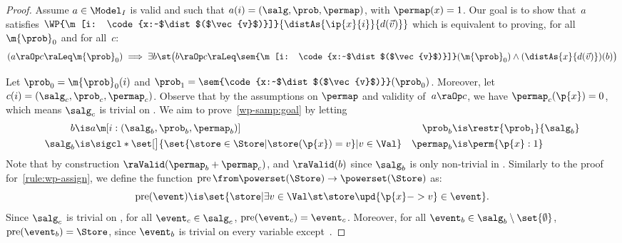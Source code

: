 \begin{proof}
  \newcommand{\specialevent}{A}
  Assume $a \in \Model_I$ is valid and such that
  $ a(i) = (\salg, \prob, \permap)$, with $\permap(x) = 1$.
  Our goal is to show that~$a$ satisfies
  $
    \WP {\m[i: \code{x:~$\dist$($\vec{v}$)}]} {\distAs{\ip{x}{i}}{d(\vec{v})}}
  $
which is equivalent to proving, for all $\m{\prob}_0$ and for all~$c$:
\begin{equation}
    (a\raOp c \raLeq  \m{\prob}_0)
    \implies
      \exists b\st \bigl(
        b\raOp c \raLeq \sem{\m[i: \code{x:~$\dist$($\vec{v}$)}]}(\m{\prob}_0)
        \land
        (\distAs{x}{d(\vec{v})})(b)
      \bigr)
    \label{wp-samp:goal}
  \end{equation}

  Let $\prob_0 = \m{\prob}_0(i)$ and
      $\prob_1 = \sem{\code{x:~$\dist$($\vec{v}$)}}(\prob_0)$.
  Moreover, let $ c(i) = (\salg_c,\prob_c,\permap_c) $.
  Observe that by the assumptions on $\permap$ and validity of~$a \raOp c$,
  we have $\permap_c(\p{x})=0$,
  which means $\salg_c$ is trivial on .
  We aim to prove~\eqref{wp-samp:goal} by letting
  \begin{align*}
    b &\is a\m[i: {(\salg_b, \prob_b, \permap_b)}]
    &
    \prob_b &\is
      \restr{\prob_1}{\salg_b}
    \\
    \salg_b &\is
      \sigcl*{
        \set[\big]{
          \set{ \store \in \Store | \store(\p{x}) = v }
        | v\in \Val
        }
      }
    &
    \permap_b &\is
      \perm{\p{x}: 1}
\end{align*}
  Note that by construction $ \raValid(\permap_b + \permap_c) $,
  and $\raValid(b)$ since $\salg_b$ is only non-trivial in .
  \newcommand{\Pre}{\operatorname{pre}}
  Similarly to the proof for~\cref{rule:wp-assign},
  we define the function
  $
    \Pre \from \powerset(\Store) \to \powerset(\Store)
  $
  as:
  \[
    \Pre(\event) \is
      \set{ \store
          | \exists v \in \Val \st \store\upd{\p{x}->v} \in \event
        }.
  \]
  Since $\salg_c$ is trivial on ,
  for all $ \event_c \in \salg_c $,
  $\Pre(\event_c) = \event_c$.
  Moreover,
  for all $ \event_b \in \salg_b \setminus \set{\emptyset} $,
  $ \Pre(\event_b) = \Store $,
  since $\event_b$ is trivial on every variable except~.


\end{proof}
